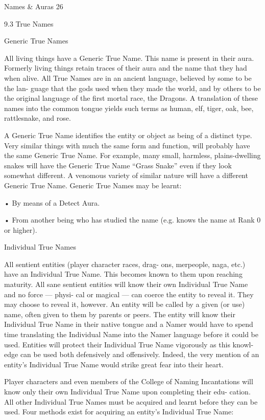 \begin{Chapter}{Names \& Auras}
26 

9.3 True Names 

Generic True Names 

All  living  things  have  a  Generic  True  Name.  This 
name  is  present  in  their  aura.  Formerly  living 
things retain traces of their aura and the name that 
they  had  when  alive.  All  True  Names  are  in  an 
ancient  language,  believed  by  some  to  be  the  lan-
guage  that  the  gods  used  when  they  made  the 
world, and by others to be the original language of 
the first mortal race, the Dragons. A  translation of 
these  names  into  the  common  tongue  yields  such 
terms  as  human,  elf,  tiger,  oak,  bee,  rattlesnake, 
and rose. 

A Generic True Name identifies the entity or object 
as being of a distinct type. Very similar things with 
much  the  same  form  and  function,  will  probably 
have  the  same  Generic  True  Name.  For  example, 
many  small,  harmless,  plains-dwelling  snakes  will 
have the Generic True Name “Grass Snake” even if 
they look somewhat different. A venomous variety 
of similar nature will have a different Generic True 
Name. Generic True Names may be learnt:  

• By means of a Detect Aura.  

•  From  another  being  who  has  studied  the  name 
(e.g. knows the name at Rank 0 or higher). 

Individual True Names 

All  sentient  entities  (player  character  races,  drag-
ons, merpeople, naga, etc.) have an Individual True 
Name. This becomes known to them upon reaching 
maturity.  All  sane  sentient  entities  will  know  their 
own Individual True Name and no force — physi-
cal or magical — can coerce the entity to reveal it. 
They  may  choose  to  reveal  it,  however.  An  entity 
will be called by a given (or use) name, often given 
to  them  by  parents  or  peers.  The  entity  will  know 
their  Individual  True  Name  in  their  native  tongue 
and a Namer would have to spend time translating 
the  Individual  Name  into  the  Namer  language 
before  it  could  be  used.  Entities  will  protect  their 
Individual  True  Name  vigorously  as  this  knowl-
edge can be used both defensively and offensively. 
Indeed,  the  very  mention  of  an  entity’s  Individual 
True Name would strike great fear into their heart. 

Player characters and even members of the College 
of  Naming  Incantations  will  know  only  their  own 
Individual  True  Name  upon  completing  their  edu-
cation.  All  other  Individual  True  Names  must  be 
acquired  and  learnt  before  they  can  be  used.  Four 
methods  exist  for  acquiring  an  entity’s  Individual 
True Name:  


\end{Chapter}
